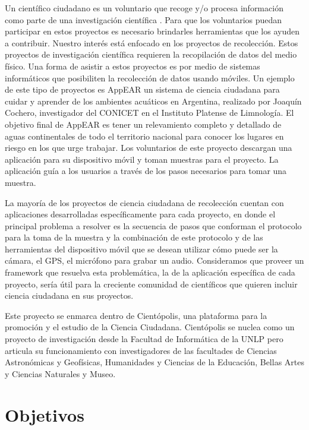 Un científico ciudadano es un voluntario que recoge y/o procesa información como parte de una investigación científica \cite{silvertown2009new}. Para que los voluntarios puedan participar en estos proyectos es necesario brindarles herramientas que los ayuden a contribuir. 
Nuestro interés está enfocado en los proyectos de recolección. Estos proyectos de investigación científica requieren la recopilación de datos del medio físico. Una forma de asistir a estos proyectos es por medio de sistemas informáticos que posibiliten la recolección de datos usando móviles. Un ejemplo de este tipo de proyectos es AppEAR un sistema de ciencia ciudadana para cuidar y aprender de los ambientes acuáticos en Argentina, realizado por Joaquín Cochero, investigador del CONICET en el Instituto Platense de Limnología. El objetivo final de AppEAR es tener un relevamiento completo y detallado de aguas continentales de todo el territorio nacional para conocer los lugares en riesgo en los que urge trabajar. Los voluntarios de este proyecto descargan una aplicación para su dispositivo móvil y toman muestras para el proyecto. La aplicación guía a los usuarios a través de los pasos necesarios para tomar una muestra.

La mayoría de los proyectos de ciencia ciudadana de recolección cuentan con aplicaciones desarrolladas específicamente para cada proyecto, en donde el principal problema a resolver es la secuencia de pasos que conforman el protocolo para la toma de la muestra y la combinación de este protocolo y de las herramientas del dispositivo móvil que se desean utilizar cómo puede ser la cámara, el GPS, el micrófono para grabar un audio. Consideramos que proveer un framework que resuelva esta problemática, la de la aplicación específica de cada proyecto, sería útil para la creciente comunidad de científicos que quieren incluir ciencia ciudadana en sus proyectos.

Este proyecto se enmarca dentro de Cientópolis\cite{cientopolis}, una plataforma para la promoción y el estudio de la Ciencia Ciudadana. Cientópolis se nuclea como un proyecto de investigación desde la Facultad de Informática de la UNLP pero articula su funcionamiento con investigadores de las facultades de Ciencias Astronómicas y Geofísicas, Humanidades y Ciencias de la Educación, Bellas Artes y Ciencias Naturales y Museo.

\section{ Objetivos }\label{sec:objetivos}		
		
